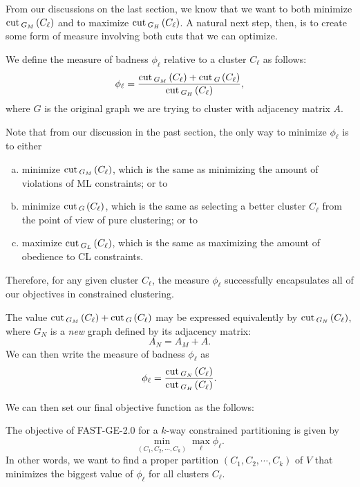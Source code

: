 From our discussions on the last section, we know that we want to both minimize $\operatorname{cut\,} _{G_M\,}(C_{\ell})$ and to maximize $\operatorname{cut\,} _{G_H\,}(C_{\ell})$.
A natural next step, then, is to create some form of measure involving both cuts that we can optimize.
\begin{definition}
  We define the measure of badness $\phi_\ell$ relative to a cluster $C_\ell$ as follows:
   \begin{equation}
      \phi_\ell = \frac{\operatorname{cut\,}_{G_M\,} (C_\ell) + \operatorname{cut\,}_{G\,}(C_\ell)}{\operatorname{cut\,}_{G_H\,}(C_\ell)},
   \end{equation}
   where $G$ is the original graph we are trying to cluster with adjacency matrix $A$.
\end{definition}
Note that from our discussion in the past section, the only way to minimize $\phi_\ell$ is to either
\begin{enumerate}[(a)]
   \item minimize $\operatorname{cut\,}_{G_M\,}(C_\ell)$, which is the same as minimizing the amount of violations of ML constraints; or to
   \item minimize $\operatorname{cut\,}_{G\,}(C_\ell)$, which is the same as selecting a better cluster $C_\ell$ from the point of view of pure clustering; or to
   \item maximize $\operatorname{cut\,}_{G_L\,}(C_\ell)$, which is the same as maximizing the amount of obedience to CL constraints.
\end{enumerate}
Therefore, for any given cluster $C_\ell$, the measure $\phi_\ell$ successfully encapsulates all of our objectives in constrained clustering.

\begin{remark}
   The value $\operatorname{cut\,}_{G_M\,}(C_\ell) + \operatorname{cut\,}_{G\,}(C_\ell)$ may be expressed equivalently by $\operatorname{cut\,}_{G_N\,}(C_\ell)$, where $G_N$ is a \textit{new} graph defined by its adjacency matrix:
   \begin{equation}
      A_N = A_M+A.
   \end{equation}
   We can then write the measure of badness $\phi_\ell$ as
   \begin{equation}
      \phi_\ell = \frac{\operatorname{cut\,}_{G_N\,}(C_\ell)}{\operatorname{cut\,}_{G_H\,}(C_\ell)}.
   \end{equation}
\end{remark}

We can then set our final objective function as the follows:
\begin{definition}
The objective of FAST-GE-2.0 for a $k$-way constrained partitioning is given by
   \begin{equation}\label{objective}
      \min_{(C_1, C_2, \cdots, C_k)} \max_{\ell} \phi _\ell.
   \end{equation}
   In other words, we want to find a proper partition $(C_1, C_2, \cdots, C_k)$ of $V$ that minimizes the biggest value of $\phi_\ell$ for all clusters $C_\ell$.
\end{definition}


